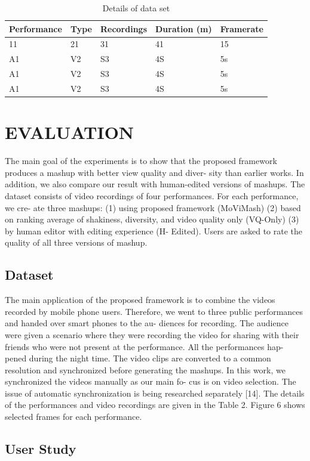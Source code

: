\documentclass{sig-alternate}
\begin{document}
\begin{table}
\centering
\caption{ Details of data set }
\begin{tabular}{p{1.2cm}|p{1.2cm}|p{1.2cm}|p{1.2cm}|l} \hline
Performance&Type&Recordings&Duration 
(m)&Framerate\\ \hline
11&21&31&41&15\\ \hline
A1&V2&S3&4S&5s\\ \hline
A1&V2&S3&4S&5s\\ \hline
A1&V2&S3&4S&5s\\ \hline
\end{tabular}
\end{table}

\section{EVALUATION}
The main goal of the experiments is to show that the proposed
framework produces a mashup with better view quality and diver-
sity than earlier works. In addition, we also compare our result with
human-edited versions of mashups. The dataset consists of video
recordings of four performances. For each performance, we cre-
ate three mashups: (1) using proposed framework (MoViMash) (2)
based on ranking average of shakiness, diversity, and video quality only (VQ-Only) (3) by human editor with editing experience (H-
Edited). Users are asked to rate the quality of all three versions of
mashup.


\subsection{Dataset}
The main application of the proposed framework is to combine
the videos recorded by mobile phone users. Therefore, we went to
three public performances and handed over smart phones to the au-
diences for recording. The audience were given a scenario where
they were recording the video for sharing with their friends who
were not present at the performance. All the performances hap-
pened during the night time. The video clips are converted to a
common resolution and synchronized before generating the mashups.
In this work, we synchronized the videos manually as our main fo-
cus is on video selection. The issue of automatic synchronization is
being researched separately [14]. The details of the performances
and video recordings are given in the Table 2. Figure 6 shows selected frames for each performance.

\subsection{User Study}
\end{document}
